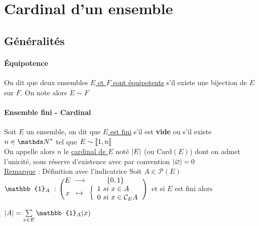 

\minitoc
	\section{Cardinal d'un ensemble}
	\subsection{Généralités}
		\traitd
		\paragraph{Équipotence}
			On dit que deux ensembles \uline{$E$ et $F$ sont équipotents} s'il existe une bijection de $E$ sur $F$. On note alors $E\sim F$ \trait ${}$ \vspace*{-1.2cm} \traitd
		\paragraph{Ensemble fini - Cardinal}
			Soit $E$ un ensemble, on dit que \uline{$E$ est fini} s'il est \textbf{vide} ou s'il existe $n\in\N^*$ tel que $E\sim \llbracket 1,n \rrbracket$ \\
			On appelle alors $n$ le \uline{cardinal de $E$} noté $\left\vert E \right\vert$ (ou $\mathrm{Card}(E)$) dont on admet l'unicité, sous réserve d'existence avec par convention $\left\vert \varnothing  \right\vert = 0$  \trait
		\vspace*{0.5cm} \\  \vspace*{0.5cm} \newpage
		\uline{Remarque} : Définition avec l'indicatrice
		Soit $A\in \mathcal{P}(E)$ \vspace*{0.2cm} \\
		$\mathbb{1}_A ~:~\appli{E}{x}{ \{0,1 \} }{ \left\{ \ard 1~si~x\in A \\ 0 ~si~ x\in \mathcal{C}_EA \arf\right.} ~$ et si $E$ est fini alors  $\mc{A} = \sum\limits_{x\in E} \mathbb{1}_A (x)$
		\vspace*{0.5cm} \\ 

